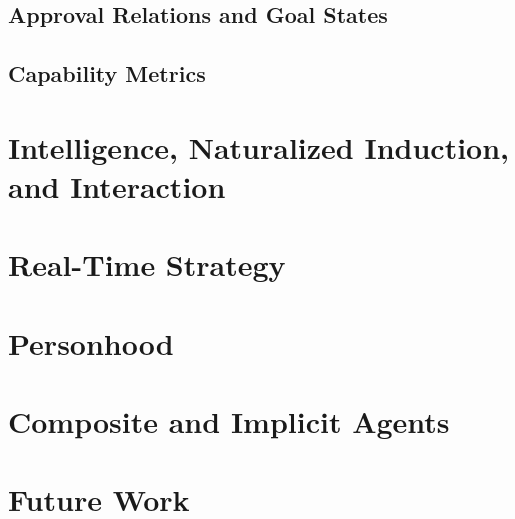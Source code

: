 \documentclass[12pt]{article}
\theoremstyle{definition}
\begin{document}

\subsection{Approval Relations and Goal States}
\label{sec:goals}



\subsection{Capability Metrics}
\label{sec:metrics}



\section{Intelligence, Naturalized Induction, and Interaction}
\label{sec:intelligence}


\section{Real-Time Strategy}
\label{sec:games}


\section{Personhood}
\label{sec:persons}


\section{Composite and Implicit Agents}
\label{sec:composites}



\section{Future Work}
\label{sec:future}



\end{document}
